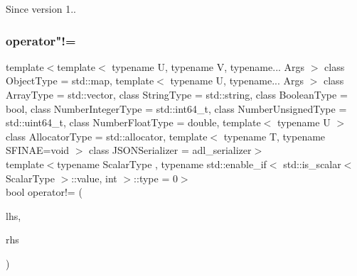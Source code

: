 \begin{DoxySince}{Since}
version 1.. 
\end{DoxySince}
\mbox{\label{classnlohmann_1_1basic__json_afefc38fc08bdb7a9a7474b5ab4a1140f}} 
\subsubsection{\texorpdfstring{operator"!=}{operator!=}\hspace{0.1cm}{\footnotesize\ttfamily [2/3]}}
{\footnotesize\ttfamily template$<$template$<$ typename U, typename V, typename... Args $>$ class Object\+Type = std\+::map, template$<$ typename U, typename... Args $>$ class Array\+Type = std\+::vector, class String\+Type  = std\+::string, class Boolean\+Type  = bool, class Number\+Integer\+Type  = std\+::int64\+\_\+t, class Number\+Unsigned\+Type  = std\+::uint64\+\_\+t, class Number\+Float\+Type  = double, template$<$ typename U $>$ class Allocator\+Type = std\+::allocator, template$<$ typename T, typename S\+F\+I\+N\+A\+E=void $>$ class J\+S\+O\+N\+Serializer = adl\+\_\+serializer$>$ \\
template$<$typename Scalar\+Type , typename std\+::enable\+\_\+if$<$ std\+::is\+\_\+scalar$<$ Scalar\+Type $>$\+::value, int $>$\+::type  = 0$>$ \\
bool operator!= (\begin{DoxyParamCaption}\item[{\mbox{\hyperlink{classnlohmann_1_1basic__json_a4057c5425f4faacfe39a8046871786ca}{const\+\_\+reference}}}]{lhs,  }\item[{const Scalar\+Type}]{rhs }\end{DoxyParamCaption})\hspace{0.3cm}{\ttfamily [friend]}}



